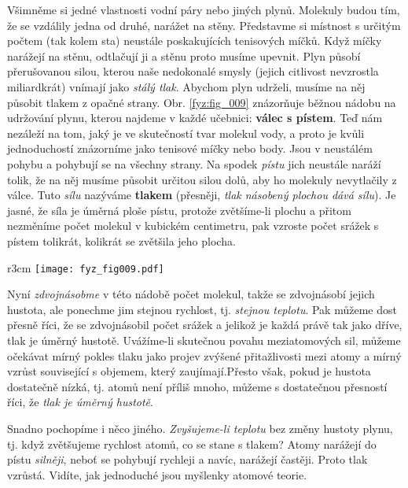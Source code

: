 {      Všimněme si jedné vlastnosti vodní páry nebo jiných plynů. Molekuly budou tím, že se vzdálily 
      jedna od druhé, narážet na stěny. Představme si místnost s určitým počtem (tak kolem sta) 
      neustále poskakujících tenisových míčků. Když míčky narážejí na stěnu, odtlačují ji a stěnu 
      proto musíme upevnit. Plyn působí přerušovanou silou, kterou naše nedokonalé smysly (jejich 
      citlivost nevzrostla miliardkrát) vnímají jako \emph{stálý tlak}. Abychom plyn udrželi, 
      musíme na něj působit tlakem z opačné strany. Obr. \ref{fyz:fig_009} znázorňuje běžnou nádobu 
      na udržování plynu, kterou najdeme v každé učebnici: \textbf{válec s pístem}. Teď nám 
      nezáleží na tom, jaký je ve skutečností tvar molekul vody, a proto je kvůli jednoduchostí 
      znázorníme jako tenisové míčky nebo body. Jsou v neustálém pohybu a pohybují se na všechny 
      strany. Na spodek \emph{pístu} jich neustále naráží tolik, že na něj musíme působit určitou 
      silou dolů, aby ho molekuly nevytlačily z válce. Tuto \emph{sílu} nazýváme \textbf{tlakem} 
      (přesněji, \emph{tlak násobený plochou dává sílu}). Je jasné, že síla je úměrná ploše pístu, 
      protože zvětšíme-li plochu a přitom nezměníme počet molekul v kubickém centimetru, pak 
      vzroste počet srážek s pístem tolikrát, kolikrát se zvětšila jeho plocha.

      \begin{wrapfigure}[16]{r}{3cm}
        \centering
        \texttt{[image: fyz\_fig009.pdf]}
        \caption{Píst \cite[s.~18]{Feynman01}}
        \label{fyz:fig_009}
      \end{wrapfigure}
      Nyní \emph{zdvojnásobme} v této nádobě počet molekul, takže se zdvojnásobí jejich hustota, 
      ale ponechme jim stejnou rychlost, tj. \emph{stejnou teplotu}. Pak můžeme dost přesně říci, 
      že se zdvojnásobil počet srážek a jelikož je každá právě tak  jako dříve, tlak 
      je úměrný hustotě. Uvážíme-li skutečnou povahu meziatomových sil, můžeme očekávat mírný 
      pokles tlaku jako projev zvýšené přitažlivosti mezi atomy a mírný vzrůst související s 
      objemem, který zaujímají.Přesto však, pokud je hustota dostatečně nízká, tj. atomů není 
      příliš mnoho, můžeme s dostatečnou přesností říci, že \emph{tlak je úměrný hustotě}.
      
      Snadno pochopíme i něco jiného. \emph{Zvyšujeme-li teplotu} bez změny hustoty plynu, tj. když 
      zvětšujeme rychlost atomů, co se stane s tlakem? Atomy narážejí do pístu \emph{silněji}, 
      neboť se pohybují rychleji a navíc, narážejí častěji. Proto tlak vzrůstá. Vidíte, jak 
      jednoduché jsou myšlenky atomové teorie.
      
}
